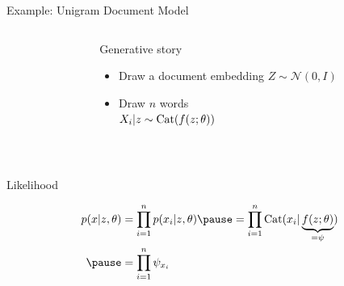 \begin{frame}{Example: Unigram Document Model}


\begin{columns}
	\begin{column}{0.2\textwidth}
    \end{column}
    \begin{column}{0.75\textwidth}
    	Generative story 
    	\begin{itemize}
			\item Draw a document embedding $Z \sim \mathcal N(0, I)$
			\item Draw $n$ words\\
			$X_i|z \sim \operatorname{Cat}(f(z; \theta))$
		\end{itemize}
    \end{column}
    \end{columns}
    
    
    ~
    
	Likelihood \pause
	\begin{small}
    \begin{equation*}
	\begin{aligned}						
		p(x|z, \theta) &= \prod_{i=1}^n p(x_i|z, \theta) \pause = \prod_{i=1}^n \Cat(x_i|\underbrace{f(z; \theta)}_{=\psi}) \\ \pause
		&= \prod_{i=1}^n \psi_{x_i}
	\end{aligned}
	\end{equation*}
	\end{small}

\end{frame}


